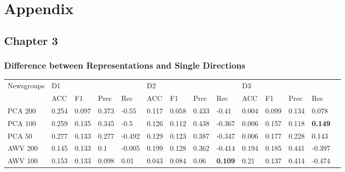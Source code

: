 \chapter{Appendix}

\section{Chapter 3}
\subsection{Difference between Representations and Single Directions}

\begin{landscape}
\begin{table}[] 
	\scriptsize
	\begin{tabular}{llllllllllllll}
		Newsgroups & D1             &     &      &     & D2             &    &      &      & D3             &   &    &     &     \\
		& ACC            & F1             & Prec           & Rec            & ACC            & F1             & Prec           & Rec            & ACC            & F1             & Prec           & Rec            &                \\
		PCA 200    & 0.254          & 0.097          & 0.373          & -0.55          & 0.117          & 0.058          & 0.433          & -0.41          & 0.004          & 0.099          & 0.134          & 0.078          &                \\
		PCA 100    & 0.259          & 0.135          & 0.345          & -0.5           & 0.126          & 0.112          & 0.438          & -0.367         & 0.006          & 0.157          & 0.118          & \textbf{0.149} &                \\
		PCA 50     & 0.277          & 0.133          & 0.277          & -0.492         & 0.129          & 0.123          & 0.387          & -0.347         & 0.006          & 0.177          & 0.228          & 0.143          &                \\
		AWV 200    & 0.145          & 0.133          & 0.1            & -0.005         & 0.199          & 0.128          & 0.362          & -0.414         & 0.194          & 0.185          & 0.441          & -0.397         &                \\
		AWV 100    & 0.153          & 0.133          & 0.098          & 0.01           & 0.043          & 0.084          & 0.06           & \textbf{0.109} & 0.21           & 0.137          & 0.414          & -0.474         &                \\

\end{tabular}
\end{table}
\end{landscape}
